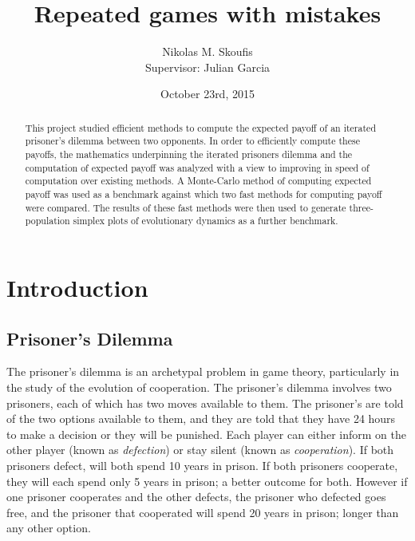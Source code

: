 \documentclass[a4paper,12pt]{article}
\begin{document}
\title{Repeated games with mistakes}
\author{Nikolas M. Skoufis \\ Supervisor: Julian Garcia}
\date{October 23rd, 2015}

\maketitle

\begin{abstract}

This project studied efficient methods to compute the expected payoff of an iterated prisoner's dilemma between two opponents.
In order to efficiently compute these payoffs, the mathematics underpinning the iterated prisoners dilemma and the computation of expected payoff was analyzed with a view to improving in speed of computation over existing methods.
A Monte-Carlo method of computing expected payoff was used as a benchmark against which two fast methods for computing payoff were compared.
The results of these fast methods were then used to generate three-population simplex plots of evolutionary dynamics as a further benchmark.

\end{abstract}

\section{Introduction}

\subsection{Prisoner's Dilemma}

The prisoner's dilemma is an archetypal problem in game theory, particularly in the study of the evolution of cooperation.
The prisoner's dilemma involves two prisoners, each of which has two moves available to them.
The prisoner's are told of the two options available to them, and they are told that they have 24 hours to make a decision or they will be punished.
Each player can either inform on the other player (known as \textit{defection}) or stay silent (known as \textit{cooperation}).
If both prisoners defect, will both spend 10 years in prison.
If both prisoners cooperate, they will each spend only 5 years in prison; a better outcome for both.
However if one prisoner cooperates and the other defects, the prisoner who defected goes free, and the prisoner that cooperated will spend 20 years in prison; longer than any other option.
\end{document}
